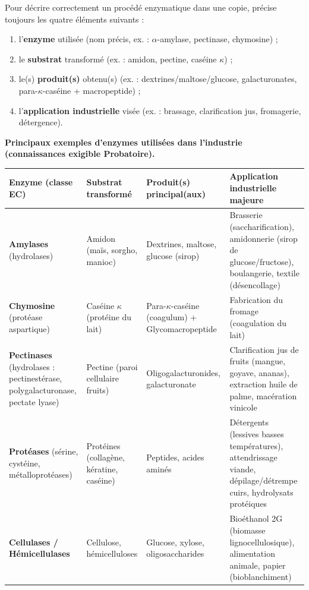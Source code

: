 \documentclass[11pt]{article}
\begin{document}
\begin{methode}
Pour décrire correctement un procédé enzymatique dans une copie, précise toujours les quatre éléments suivants :
\begin{enumerate}
\item l'\textbf{enzyme} utilisée (nom précis, ex. : $\alpha$-amylase, pectinase, chymosine) ;
\item le \textbf{substrat} transformé (ex. : amidon, pectine, caséine $\kappa$) ;
\item le(s) \textbf{produit(s)} obtenu(s) (ex. : dextrines/maltose/glucose, galacturonates, para-$\kappa$-caséine + macropeptide) ;
\item l'\textbf{application industrielle} visée (ex. : brassage, clarification jus, fromagerie, détergence).
\end{enumerate}
\end{methode}

\textbf{Principaux exemples d'enzymes utilisées dans l'industrie (connaissances exigible Probatoire).}

\begin{center}
\begin{tabularx}{\linewidth}{|l|X|X|X|}
\hline
\rowcolor{popblueL} \textbf{Enzyme (classe EC)} & \textbf{Substrat transformé} & \textbf{Produit(s) principal(aux)} & \textbf{Application industrielle majeure} \\
\hline
\textbf{Amylases} (hydrolases) & Amidon (maïs, sorgho, manioc) & Dextrines, maltose, glucose (sirop) & Brasserie (saccharification), amidonnerie (sirop de glucose/fructose), boulangerie, textile (désencollage) \\
\hline
\textbf{Chymosine} (protéase aspartique) & Caséine $\kappa$ (protéine du lait) & Para-$\kappa$-caséine (coagulum) + Glycomacropeptide & Fabrication du fromage (coagulation du lait) \\
\hline
\textbf{Pectinases} (hydrolases : pectinestérase, polygalacturonase, pectate lyase) & Pectine (paroi cellulaire fruits) & Oligogalacturonides, galacturonate & Clarification jus de fruits (mangue, goyave, ananas), extraction huile de palme, macération vinicole \\
\hline
\textbf{Protéases} (sérine, cystéine, métalloprotéases) & Protéines (collagène, kératine, caséine) & Peptides, acides aminés & Détergents (lessives basses températures), attendrissage viande, dépilage/détrempe cuirs, hydrolysats protéiques \\
\hline
\textbf{Cellulases / Hémicellulases} & Cellulose, hémicelluloses & Glucose, xylose, oligosaccharides & Bioéthanol 2G (biomasse lignocellulosique), alimentation animale, papier (bioblanchiment) \\
\hline
\end{tabularx}
\end{center}
\end{document}
